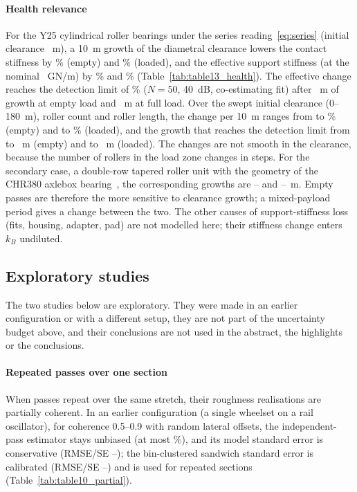 \paragraph{Health relevance}\label{sec:res-health}
For the Y25 cylindrical roller bearings under the series reading~\eqref{eq:series} (initial clearance
\ClearanceZero~\textmu m), a 10~\textmu m growth of the diametral clearance lowers the contact stiffness
by \ContactPctTenEmpty\% (empty) and \ContactPctTenLoaded\% (loaded), and the effective support
stiffness (at the nominal \kBnom~GN/m) by \EffPctTenEmpty\% and \EffPctTenLoaded\% (Table~\ref{tab:table13_health}). The effective
change reaches the detection limit of \HealthMDC\% ($N=50$, 40~dB, co-estimating fit) after
\CylGrowthMDCEmptyNom~\textmu m of growth at empty load and \CylGrowthMDCLoadedNom~\textmu m at full
load. Over the swept initial clearance (0--180~\textmu m), roller count and roller length, the change
per 10~\textmu m ranges from \CylEffTenEmptyMin{} to \CylEffTenEmptyMax\% (empty) and
\CylEffTenLoadedMin{} to \CylEffTenLoadedMax\% (loaded), and the growth that reaches the detection
limit from \CylGrowthMDCEmptyMin{} to \CylGrowthMDCEmptyMax~\textmu m (empty) and
\CylGrowthMDCLoadedMin{} to \CylGrowthMDCLoadedMax~\textmu m (loaded). The changes are not smooth in
the clearance, because the number of rollers in the load zone changes in steps. For the secondary case,
a double-row tapered roller unit with the geometry of the CHR380 axlebox bearing~\citep[Table~3]{li2019axlebox}, the corresponding growths are \TapGrowthMDCEmptyMin--\TapGrowthMDCEmptyMax{}
and \TapGrowthMDCLoadedMin--\TapGrowthMDCLoadedMax~\textmu m. Empty passes are therefore the more
sensitive to clearance growth; a mixed-payload period gives a change between the two. The other causes
of support-stiffness loss (fits, housing, adapter, pad) are not modelled here; their stiffness change
enters $k_B$ undiluted.


\subsection{Exploratory studies}\label{sec:res-exploratory}
The two studies below are exploratory. They were made in an earlier configuration or with a different
setup, they are not part of the uncertainty budget above, and their conclusions are not used in the
abstract, the highlights or the conclusions.

\paragraph{Repeated passes over one section}\label{sec:res-repeated}
When passes repeat over the same stretch, their roughness realisations are partially coherent. In an
earlier configuration (a single wheelset on a rail oscillator), for coherence
0.5--0.9 with random lateral offsets, the independent-pass estimator stays unbiased (at most
\PCBiasMax\%), and its model standard error is conservative (RMSE/SE \PCModelRatioMin--\PCModelRatioMax);
the bin-clustered sandwich standard error is calibrated (RMSE/SE \PCSandRatioMin--\PCSandRatioMax) and is
used for repeated sections (Table~\ref{tab:table10_partial}).

